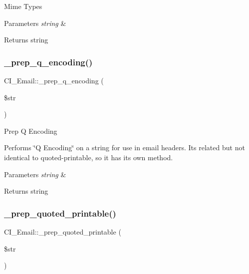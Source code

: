 Mime Types


\begin{DoxyParams}{Parameters}
{\em string} & \\
\hline
\end{DoxyParams}
\begin{DoxyReturn}{Returns}
string 
\end{DoxyReturn}
\mbox{\label{class_c_i___email_a65f3f89ca5e4fabbcab14dfff767c62f}} 
\subsubsection{\texorpdfstring{\+\_\+prep\+\_\+q\+\_\+encoding()}{\_prep\_q\_encoding()}}
{\footnotesize\ttfamily C\+I\+\_\+\+Email\+::\+\_\+prep\+\_\+q\+\_\+encoding (\begin{DoxyParamCaption}\item[{}]{\$str }\end{DoxyParamCaption})\hspace{0.3cm}{\ttfamily [protected]}}

Prep Q Encoding

Performs \char`\"{}\+Q Encoding\char`\"{} on a string for use in email headers. It\textquotesingle{}s related but not identical to quoted-\/printable, so it has its own method.


\begin{DoxyParams}{Parameters}
{\em string} & \\
\hline
\end{DoxyParams}
\begin{DoxyReturn}{Returns}
string 
\end{DoxyReturn}
\mbox{\label{class_c_i___email_ac3c8b2a557c9f0a69c4025f00dbfbe3a}} 
\subsubsection{\texorpdfstring{\+\_\+prep\+\_\+quoted\+\_\+printable()}{\_prep\_quoted\_printable()}}
{\footnotesize\ttfamily C\+I\+\_\+\+Email\+::\+\_\+prep\+\_\+quoted\+\_\+printable (\begin{DoxyParamCaption}\item[{}]{\$str }\end{DoxyParamCaption})\hspace{0.3cm}{\ttfamily [protected]}}

